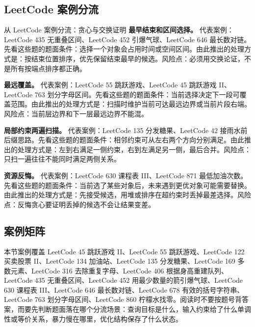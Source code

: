 \subsection{LeetCode 案例分流}

\begin{principlebox}{从 LeetCode 案例分流：贪心与交换证明}
\textbf{最早结束和区间选择。}
代表案例：LeetCode 435 无重叠区间、LeetCode 452 引爆气球、LeetCode 646 最长数对链。先看这些题的题面条件：选择一个对象会占用时间或空间区间。由此推出的处理方式是：按结束位置排序，优先保留结束最早的候选。风险点：必须用交换论证，不是所有按端点排序都正确。

\textbf{最远覆盖。}
代表案例：LeetCode 55 跳跃游戏、LeetCode 45 跳跃游戏 II、LeetCode 763 划分字母区间。先看这些题的题面条件：当前选择决定下一段可覆盖范围。由此推出的处理方式是：扫描时维护当前可达最远边界或当前片段右端。风险点：当前层边界和下一层最远边界不能混。

\textbf{局部约束两遍扫描。}
代表案例：LeetCode 135 分发糖果、LeetCode 42 接雨水前后缀思路。先看这些题的题面条件：相邻约束可从左右两个方向分别满足。由此推出的处理方式是：左到右满足一侧约束，右到左满足另一侧，最后合并。风险点：只扫一遍往往不能同时满足两侧关系。

\textbf{资源反悔。}
代表案例：LeetCode 630 课程表 III、LeetCode 871 最低加油次数。先看这些题的题面条件：当前选了某些对象后，未来遇到更优对象可能需要替换。由此推出的处理方式是：先接受候选，用堆或排序在超约束时丢掉最差选择。风险点：反悔贪心要证明丢掉的候选不会让结果变差。

\end{principlebox}

\subsection{案例矩阵}

本节案例覆盖 LeetCode 45 跳跃游戏 II、LeetCode 55 跳跃游戏、LeetCode 122 买卖股票 II、LeetCode 134 加油站、LeetCode 135 分发糖果、LeetCode 169 多数元素、LeetCode 316 去除重复字母、LeetCode 406 根据身高重建队列、LeetCode 435 无重叠区间、LeetCode 452 用最少数量的箭引爆气球、LeetCode 630 课程表 III、LeetCode 646 最长数对链、LeetCode 678 有效的括号字符串、LeetCode 763 划分字母区间、LeetCode 860 柠檬水找零。阅读时不要按题号背答案，而要先判断题面落在哪个分流场景：查询目标是什么，输入约束给了什么单调性或等价关系，暴力慢在哪里，优化结构保存了什么状态。


